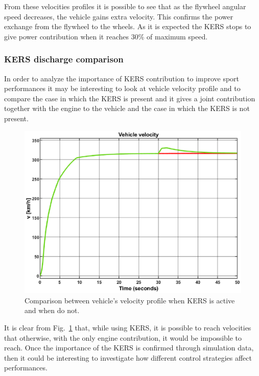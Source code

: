 \documentclass[11pt]{article}
\begin{document}
From these velocities profiles it is possible to see that as the flywheel angular speed decreases, the vehicle gains extra velocity. This confirms the power exchange from the flywheel to the wheels. As it is expected the KERS stops to give power contribution when it reaches $30\%$ of maximum speed.

\subsubsection{KERS discharge comparison}

In order to analyze the importance of KERS contribution to improve sport performances it may be interesting to look at vehicle velocity profile and to compare the case in which the KERS is present and it gives a joint contribution together with the engine to the vehicle and the case in which the KERS is not present.

\begin{figure}[H]
	\centering
	\includegraphics[width=.6\textwidth]{Images/Results_Dynamics/Discharge_comparison/acceleration_kers_vs_nokers.eps}
	\caption{Comparison between vehicle's velocity profile when KERS is active and when do not.}
	\label{fig: k vs nok}
\end{figure}

It is clear from Fig.~\ref{fig: k vs nok} that, while using KERS, it is possible to reach velocities that otherwise, with the only engine contribution, it would be impossible to reach. Once the importance of the KERS is confirmed through simulation data, then it could be interesting to investigate how different control strategies affect performances.
\end{document}
